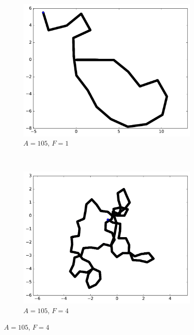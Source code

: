 	\begin{figure}[htb]
		\begin{subfigure}[t]{\subImgWmo}
			\centering
			\includegraphics[width=\textwidth]{figures/ch3/synTraj_219_105_1}
			\caption[$A = 105$, $F=1$]{$A = 105$, $F=1$}
			\label{fig:synTraj_219_105_1}
		\end{subfigure}
		~
		\begin{subfigure}[t]{\subImgWmo}
			\centering
			\includegraphics[width=\textwidth]{figures/ch3/synTraj_219_105_4}
			\caption[$A = 105$, $F=4$]{$A = 105$, $F=4$}
			\label{fig:synTraj_219_105_4}
		\end{subfigure}

\end{figure}
